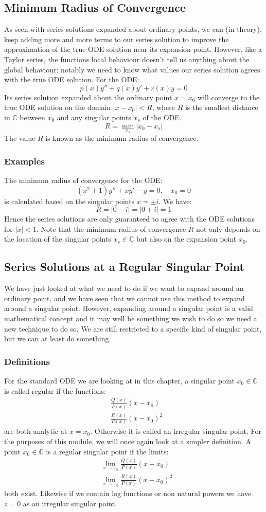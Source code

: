 \documentclass[12pt]{article}
\begin{document}
\subsection{Minimum Radius of Convergence}
As seen with series solutions expanded about ordinary points, we can (in theory), keep adding more and more terms to our series solution to improve the approximation of the true ODE solution near its expansion point. However, like a Taylor series, the functions local behaviour doesn't tell us anything about the global behaviour: notably we need to know what values our series solution agrees with the true ODE solution. For the ODE:
\[p(x)y''+q(x)y'+r(x)y=0\]
Its series solution expanded about the ordinary point \(x=x_0\) will converge to the true ODE solution on the domain \(|x-x_0|<R\), where \(R\) is the smallest distance in \(\mathbb{C}\) between \(x_0\) and any singular points \(x_s\) of the ODE.
\[R=\min_{x_s}|x_0-x_s|\]
The value \(R\) is known as the minimum radius of convergence.
\subsubsection*{Examples}
The minimum radius of convergence for the ODE:
\[(x^2+1)y''+xy'-y=0,\quad x_0=0\]
is calculated based on the singular points \(x=\pm i\). We have:
\[R=|0-i|=|0+i|=1\]
Hence the series solutions are only guaranteed to agree with the ODE solutions for \(|x|<1\). Note that the minimum radius of convergence \(R\) not only depends on the location of the singular points \(x_s\in\mathbb{C}\) but also on the expansion point \(x_0\).
\subsection{Series Solutions at a Regular Singular Point}
We have just looked at what we need to do if we want to expand around an ordinary point, and we have seen that we cannot use this method to expand around a singular point. However, expanding around a singular point is a valid mathematical concept and it may well be something we wish to do so we need a new technique to do so. We are still restricted to a specific kind of singular point, but we can at least do something.
\subsubsection{Definitions}
For the standard ODE we are looking at in this chapter, a singular point \(x_0\in\mathbb{C}\) is called regular if the functions:
\begin{align*}
    &\frac{Q(x)}{P(x)}(x-x_0) \\
    &\frac{R(x)}{P(x)}(x-x_0)^2
\end{align*}
are both analytic at \(x=x_0\). Otherwise it is called an irregular singular point. For the purposes of this module, we will once again look at a simpler definition. A point \(x_0\in\mathbb{C}\) is a regular singular point if the limits:
\begin{align*}
    &\lim_{x\to x_0}\frac{Q(x)}{P(x)}(x-x_0) \\
    &\lim_{x\to x_0}\frac{R(x)}{P(x)}(x-x_0)^2
\end{align*}
both exist. Likewise if we contain log functions or non natural powers we have \(z=0\) as an irregular singular point.
\end{document}
